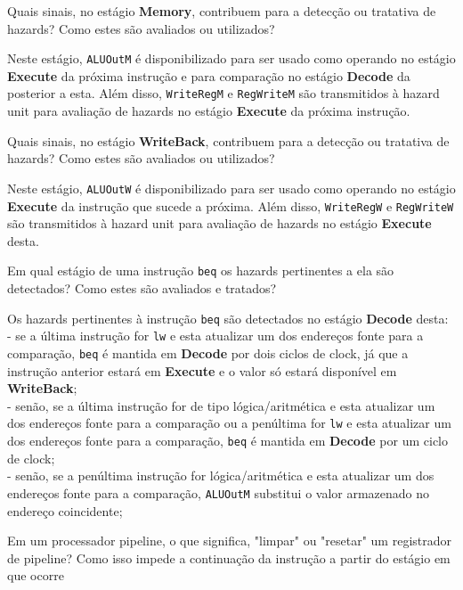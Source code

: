 \documentclass{article}
\begin{document}
{\large Quais sinais, no estágio \textbf{Memory}, contribuem para a detecção ou tratativa de hazards? Como estes são avaliados ou utilizados?\vspace{1mm}}

\noindent Neste estágio, \verb|ALUOutM| é disponibilizado para ser usado como operando no estágio \textbf{Execute} da próxima instrução e para comparação no estágio \textbf{Decode} da posterior a esta. Além disso, \verb|WriteRegM| e \verb|RegWriteM| são transmitidos à hazard unit para avaliação de hazards no estágio \textbf{Execute} da próxima instrução.
\bigbreak

{\large Quais sinais, no estágio \textbf{WriteBack}, contribuem para a detecção ou tratativa de hazards? Como estes são avaliados ou utilizados?\vspace{1mm}}

\noindent Neste estágio, \verb|ALUOutW| é disponibilizado para ser usado como operando no estágio \textbf{Execute} da instrução que sucede a próxima. Além disso, \verb|WriteRegW| e \verb|RegWriteW| são transmitidos à hazard unit para avaliação de hazards no estágio \textbf{Execute} desta.
\bigbreak

{\large Em qual estágio de uma instrução \verb|beq| os hazards pertinentes a ela são detectados? Como estes são avaliados e tratados?\vspace{1mm}}

\noindent Os hazards pertinentes à instrução \verb|beq| são detectados no estágio \textbf{Decode} desta:\\
- se a última instrução for \verb|lw| e esta atualizar um dos endereços fonte para a comparação, \verb|beq| é mantida em \textbf{Decode} por dois ciclos de clock, já que a instrução anterior estará em \textbf{Execute} e o valor só estará disponível em \textbf{WriteBack};\\
- senão, se a última instrução for de tipo lógica/aritmética e esta atualizar um dos endereços fonte para a comparação ou a penúltima for \verb|lw| e esta atualizar um dos endereços fonte para a comparação, \verb|beq| é mantida em \textbf{Decode} por um ciclo de clock;\\
- senão, se a penúltima instrução for lógica/aritmética e esta atualizar um dos endereços fonte para a comparação, \verb|ALUOutM| substitui o valor armazenado no endereço coincidente;
\bigbreak

{\large Em um processador pipeline, o que significa, "limpar" ou "resetar" um registrador de pipeline? Como isso impede a continuação da instrução a partir do estágio em que ocorre \vspace{1mm}}
\end{document}

